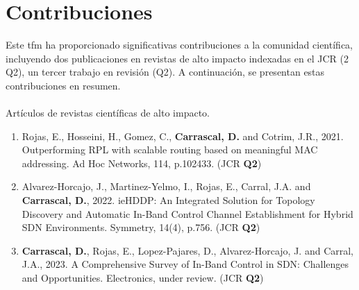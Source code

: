 \section{Contribuciones}
\label{sec:contributions}


Este \gls*{tfm} ha proporcionado significativas contribuciones a la comunidad científica, incluyendo dos publicaciones en revistas de alto impacto indexadas en el JCR (2 Q2), un tercer trabajo en revisión (Q2). A continuación, se presentan estas contribuciones en resumen.\\
\\
Artículos de revistas científicas de alto impacto.

\begin{enumerate}
    \item Rojas, E., Hosseini, H., Gomez, C., \textbf{Carrascal, D.} and Cotrim, J.R., 2021. Outperforming RPL with scalable routing based on meaningful MAC addressing. Ad Hoc Networks, 114, p.102433. (JCR \textbf{Q2})
    \item Alvarez-Horcajo, J., Martinez-Yelmo, I., Rojas, E., Carral, J.A. and \textbf{Carrascal, D.}, 2022. ieHDDP: An Integrated Solution for Topology Discovery and Automatic In-Band Control Channel Establishment for Hybrid SDN Environments. Symmetry, 14(4), p.756. (JCR \textbf{Q2})
    \item \textbf{Carrascal, D.}, Rojas, E., Lopez-Pajares, D., Alvarez-Horcajo, J. and Carral, J.A., 2023. A Comprehensive Survey of In-Band Control in SDN:
          Challenges and Opportunities. Electronics, under review. (JCR \textbf{Q2})
\end{enumerate}



